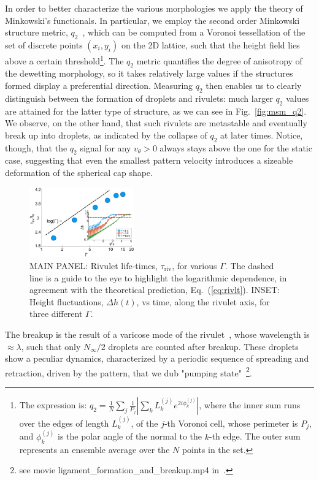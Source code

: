 \documentclass[twocolumn,amsmath,amssymb,showpacs,prl,superscriptaddress]{revtex4-1} %
\begin{document}
In order to better characterize the various morphologies we apply the theory of Minkowski's functionals. 
In particular, we employ the second order Minkowski structure metric, $q_2$~\cite{doi:10.1063/1.4774084, Schaller2020}, which can be computed from a Voronoi tessellation of the set of discrete points $(x_i, y_i)$ on the 2D lattice, such that the height field lies above a certain threshold\footnote{The expression is: $q_2 = \frac{1}{N}\sum_j \frac{1}{P_j}|\sum_k L^{(j)}_k e^{2i\phi^{(j)}_k}|$, where the inner sum runs over the edges of length $L^{(j)}_k$, of the $j$-th Voronoi cell, whose perimeter is $P_j$, and $\phi^{(j)}_k$ is the polar angle of the normal to the $k$-th edge. 
The outer sum represents an ensemble average over the $N$ points in the set.}. The $q_2$ metric quantifies the degree of anisotropy of the dewetting morphology, so it takes relatively large values if the structures formed display a preferential direction. 
Measuring $q_2$ then enables us to clearly distinguish between the formation of droplets and rivulets: much larger $q_2$ values are attained for the latter type of structure, as we can see in Fig.~\ref{fig:msm_q2}.
We observe, on the other hand, that such rivulets are metastable and eventually break up into droplets, as indicated by the collapse of $q_2$ at later times. 
Notice, though, that the $q_2$ signal for any $v_{\theta} >0$ always stays above the one for the static case, suggesting that even the smallest pattern velocity introduces a sizeable deformation of the spherical cap shape.
\begin{figure}
    \centering
    \includegraphics[width=0.4\textwidth]{Figure_5.pdf}
    \caption{MAIN PANEL: Rivulet life-times, $\tau_{\text{riv}}$, for various $\Gamma$.
    The dashed line is a guide to the eye to highlight the logarithmic dependence, in agreement with 
    the theoretical prediction, Eq.~(\ref{eq:rivlt}).
    INSET: Height fluctuations, $\Delta h(t)$, vs time, along the rivulet axis, for three different $\Gamma$.
    }
    \label{fig:stab_ligs_lam2}
\end{figure}
The breakup is the result of a varicose mode of the rivulet~\cite{doi:10.1063/1.3211248, PhysRevE.77.061605}, whose wavelength is $\approx\lambda$, such that only $N_{\infty}/2$ droplets are counted after breakup. 
These droplets show a peculiar dynamics, characterized by a periodic sequence of spreading and retraction, driven by the pattern, that we dub "pumping state"~\footnote{see movie ligament\_formation\_and\_breakup.mp4 in~\cite{SuppMat}.}.
\end{document}
